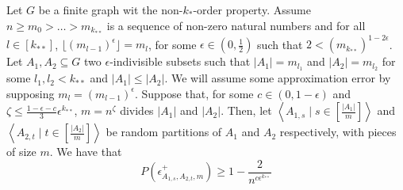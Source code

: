     \lemma[Claim 4.13]
        Let $G$ be a finite graph wit the non-$k_{*}$-order property.
        Assume $n \geq m_0 > \dots > m_{k_{**}}$ is a sequence of non-zero natural numbers and for all $l \in [k_{**}]$,
            $\lfloor (m_{l-1})^\epsilon \rfloor = m_l$, for some $\epsilon \in (0, \frac{1}{2})$ such that $2 < (m_{k_{**}})^{1-2\epsilon}$.
        Let $A_1, A_2 \subseteq G$ two $\epsilon$-indivisible subsets such that $|A_1| = m_{l_1}$ and $|A_2| = m_{l_2}$
            for some $l_1, l_2 < k_{**}$ and $|A_1| \leq |A_2|$.
        We will assume some approximation error by supposing $m_l = (m_{l-1})^\epsilon$.
        Suppose that, for some $c \in (0, 1-\epsilon)$ and $\zeta \leq \frac{1 - \epsilon - c}{3}\epsilon^{k_{**}}$,
            $m = n^\zeta$ divides $|A_1|$ and $|A_2|$.
        Then, let $\left< A_{1,s} \mid s \in \left[ \frac{|A_1|}{m} \right] \right>$ and
            $\left< A_{2,t} \mid t \in \left[ \frac{|A_2|}{m} \right] \right>$ be random partitions of $A_1$ and $A_2$
            respectively, with pieces of size $m$.
        We have that
        \[
            P(\epsilon^+_{A_{1,s},A_{2,t},m}) \geq 1 - \frac{2}{n^{c\epsilon^{k_{**}}}}
        \]
